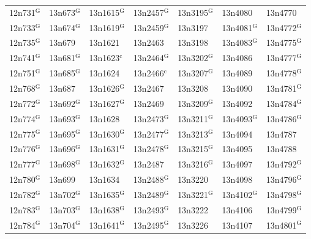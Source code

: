\documentclass[12pt, oneside]{amsart}
\begin{document}
{\begin{longtable}{*{7}{>{\raggedright\arraybackslash}p{}}}
12n731$^{\mathrm{G}}$ & 13n673$^{\mathrm{G}}$ & 13n1615$^{\mathrm{G}}$ & 13n2457$^{\mathrm{G}}$ & 13n3195$^{\mathrm{G}}$ & 13n4080 & 13n4770 \\
12n733$^{\mathrm{G}}$ & 13n674$^{\mathrm{G}}$ & 13n1619$^{\mathrm{G}}$ & 13n2459$^{\mathrm{G}}$ & 13n3197 & 13n4081$^{\mathrm{G}}$ & 13n4772$^{\mathrm{G}}$ \\
12n735$^{\mathrm{G}}$ & 13n679 & 13n1621 & 13n2463 & 13n3198 & 13n4083$^{\mathrm{G}}$ & 13n4775$^{\mathrm{G}}$ \\
12n741$^{\mathrm{G}}$ & 13n681$^{\mathrm{G}}$ & 13n1623$^{\mathrm{c}}$ & 13n2464$^{\mathrm{G}}$ & 13n3202$^{\mathrm{G}}$ & 13n4086 & 13n4777$^{\mathrm{G}}$ \\
12n751$^{\mathrm{G}}$ & 13n685$^{\mathrm{G}}$ & 13n1624 & 13n2466$^{\mathrm{c}}$ & 13n3207$^{\mathrm{G}}$ & 13n4089 & 13n4778$^{\mathrm{G}}$ \\
12n768$^{\mathrm{G}}$ & 13n687 & 13n1626$^{\mathrm{G}}$ & 13n2467 & 13n3208 & 13n4090 & 13n4781$^{\mathrm{G}}$ \\
12n772$^{\mathrm{G}}$ & 13n692$^{\mathrm{G}}$ & 13n1627$^{\mathrm{G}}$ & 13n2469 & 13n3209$^{\mathrm{G}}$ & 13n4092 & 13n4784$^{\mathrm{G}}$ \\
12n774$^{\mathrm{G}}$ & 13n693$^{\mathrm{G}}$ & 13n1628 & 13n2473$^{\mathrm{G}}$ & 13n3211$^{\mathrm{G}}$ & 13n4093$^{\mathrm{G}}$ & 13n4786$^{\mathrm{G}}$ \\
12n775$^{\mathrm{G}}$ & 13n695$^{\mathrm{G}}$ & 13n1630$^{\mathrm{G}}$ & 13n2477$^{\mathrm{G}}$ & 13n3213$^{\mathrm{G}}$ & 13n4094 & 13n4787 \\
12n776$^{\mathrm{G}}$ & 13n696$^{\mathrm{G}}$ & 13n1631$^{\mathrm{G}}$ & 13n2478$^{\mathrm{G}}$ & 13n3215$^{\mathrm{G}}$ & 13n4095 & 13n4788 \\
12n777$^{\mathrm{G}}$ & 13n698$^{\mathrm{G}}$ & 13n1632$^{\mathrm{G}}$ & 13n2487 & 13n3216$^{\mathrm{G}}$ & 13n4097 & 13n4792$^{\mathrm{G}}$ \\
12n780$^{\mathrm{G}}$ & 13n699 & 13n1634 & 13n2488$^{\mathrm{G}}$ & 13n3220 & 13n4098 & 13n4796$^{\mathrm{G}}$ \\
12n782$^{\mathrm{G}}$ & 13n702$^{\mathrm{G}}$ & 13n1635$^{\mathrm{G}}$ & 13n2489$^{\mathrm{G}}$ & 13n3221$^{\mathrm{G}}$ & 13n4102$^{\mathrm{G}}$ & 13n4798$^{\mathrm{G}}$ \\
12n783$^{\mathrm{G}}$ & 13n703$^{\mathrm{G}}$ & 13n1638$^{\mathrm{G}}$ & 13n2493$^{\mathrm{G}}$ & 13n3222 & 13n4106 & 13n4799$^{\mathrm{G}}$ \\
12n784$^{\mathrm{G}}$ & 13n704$^{\mathrm{G}}$ & 13n1641$^{\mathrm{G}}$ & 13n2495$^{\mathrm{G}}$ & 13n3226 & 13n4107 & 13n4801$^{\mathrm{G}}$ \\

\end{longtable}}
\end{document}
